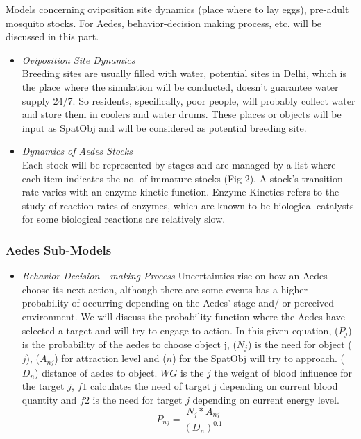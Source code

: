     \indent Models concerning oviposition site dynamics (place where to lay eggs), pre-adult mosquito stocks. For Aedes, behavior-decision making process, etc. will be discussed in this part.
    
    \begin{itemize}
        \item \textit{Oviposition Site Dynamics}\\
			Breeding sites are usually filled with water, potential sites in Delhi, which is the place where the simulation will be conducted, doesn’t guarantee water supply 24/7. So residents, specifically, poor people, will probably collect water and store them in coolers and water drums. These places or objects will be input as SpatObj and will be considered as potential breeding site.
		
        \item \textit{Dynamics of Aedes Stocks}\\
        
        Each stock will be represented by stages and are managed by a list where each item indicates the no. of immature stocks (Fig 2). A stock's transition rate varies with an enzyme kinetic function. Enzyme Kinetics refers to the study of reaction rates of enzymes, which are known to be biological catalysts for some biological reactions are relatively slow.\cite{enzyme}
    \end{itemize}
    \subsubsection{Aedes Sub-Models}
    \begin{itemize}
        \item \textit{Behavior Decision - making Process}
        Uncertainties rise on how an Aedes choose its next action, although there are some events has a higher probability of occurring depending on the Aedes’ stage and/ or perceived environment. We will discuss the probability function where the Aedes have selected a target and will try to engage to action. In this given equation, ($P_{j}$) is the probability of the aedes to choose object j, ($N_j$) is the need for object ($j$), ($A_{nj}$) for attraction level and ($n$) for the SpatObj will try to approach. ($D_{n}$) distance of aedes to object.
        $WG$ is the $j$ the weight of blood influence for the target $j$, $f1$ calculates the need of target j depending on current blood quantity and $f2$ is the need for target $j$ depending on current energy level. 
          \begin{equation}\
        P_{nj} = \frac{N_j * A_{nj}}{(D_n)^{0.1}}
    \end{equation}
    \end{itemize} 

